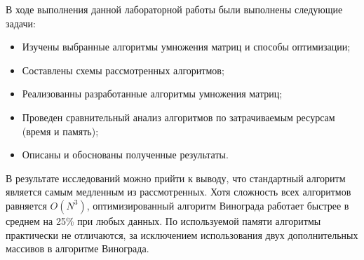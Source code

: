
В ходе выполнения данной лабораторной работы были выполнены следующие задачи:
\begin{itemize}
	\item Изучены выбранные алгоритмы умножения матриц и способы оптимизации;
	\item Составлены схемы рассмотренных алгоритмов;
	\item Реализованны разработанные алгоритмы умножения матриц;
	\item Проведен сравнительный анализ алгоритмов по затрачиваемым ресурсам (время и память);
	\item Описаны и обоснованы полученные результаты.
\end{itemize}

В результате исследований можно прийти к выводу, что стандартный алгоритм является самым медленным из рассмотренных. Хотя сложность всех алгоритмов равняется $O(N^3)$, оптимизированный алгоритм Винограда работает быстрее в среднем на 25\% при любых данных. По используемой памяти алгоритмы практически не отличаются, за исключением использования двух дополнительных массивов в алгоритме Винограда.